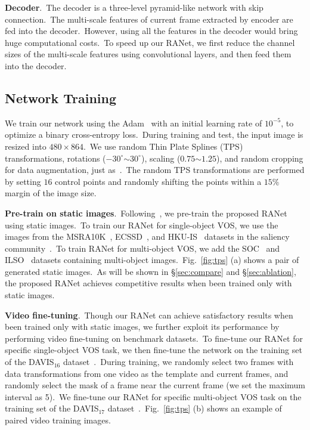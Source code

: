 \documentclass[10pt,twocolumn,letterpaper]{article}
\begin{document}
\noindent
\textbf{Decoder}.\ The decoder is a three-level pyramid-like network with skip connection.\
The multi-scale features of current frame extracted by encoder are fed into the decoder.\
However, using all the features in the decoder would bring huge computational costs.\ To speed up our RANet, we first reduce the channel sizes of the multi-scale features using convolutional layers, and then feed them into the decoder.\ 








\subsection{Network Training}
\label{sec:train}
We train our network using the Adam~\cite{adam} with an initial learning rate of $10^{-5}$, to optimize a binary cross-entropy loss.\ During training and test, the input image is resized into $480\times864$.\ We use random Thin Plate Splines (TPS) transformations, rotations ($-30^{\circ}$$\sim$$30^{\circ}$), scaling ($0.75$$\sim$$1.25$), and random cropping for data augmentation, just as~\cite{masktrack}.\ The random TPS transformations are performed by setting $16$ control points and randomly shifting the points within a $15\%$ margin of the image size. 








\noindent
\textbf{Pre-train on static images}.\
Following~\cite{masktrack}, we pre-train the proposed RANet using static images.\ To train our RANet for single-object VOS, we use the images from the MSRA10K~\cite{msra10k}, ECSSD~\cite{ecssd}, and HKU-IS~\cite{hku} datasets in the saliency community~\cite{fan2019rethinking,Zhao2019RgbdSal,Fan2019VideoSal,Zhao2019ebd,un03,Lu_2019_CVPR}.\ To train RANet for multi-object VOS, we add the SOC~\cite{soc} and ILSO~\cite{ilso} datasets containing multi-object images.\ Fig.~\ref{fig:tps} (a) shows a pair of generated static images.\ As will be shown in \S\ref{sec:compare} and \S\ref{sec:ablation}, the proposed RANet achieves competitive results when been trained only with static images.



\noindent
\textbf{Video fine-tuning}.\
Though our RANet can achieve satisfactory results when been trained only with static images, we further exploit its performance by performing video fine-tuning on benchmark datasets.\ To fine-tune our RANet for specific single-object VOS task, we then fine-tune the network on the training set of the DAVIS$_{16}$ dataset~\cite{davis2016}.\ During training, we randomly select two frames with data transformations from one video as the template and current frames, and randomly select the mask of a frame near the current frame (we set the maximum interval as 5).\ We fine-tune our RANet for specific multi-object VOS task on the training set of the DAVIS$_{17}$ dataset~\cite{davis2017}.\ Fig.~\ref{fig:tps} (b) shows an example of paired video training images.
\end{document}
